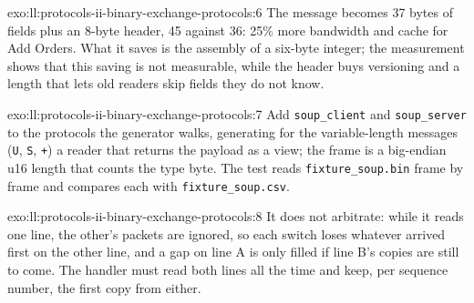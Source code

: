 \begin{solution}{exo:ll:protocols-ii-binary-exchange-protocols:6}
The message becomes 37 bytes of fields plus an 8-byte header, 45 against 36: 25\% more bandwidth and cache for Add Orders.
What it saves is the assembly of a six-byte integer; the measurement shows that this saving is not measurable, while the header
buys versioning and a length that lets old readers skip fields they do not know.
\end{solution}

\begin{solution}{exo:ll:protocols-ii-binary-exchange-protocols:7}
Add \texttt{soup\_client} and \texttt{soup\_server} to the protocols the generator walks, generating for the variable-length
messages (\texttt{U}, \texttt{S}, \texttt{+}) a reader that returns the payload as a view; the frame is a big-endian u16 length
that counts the type byte. The test reads \texttt{fixture\_soup.bin} frame by frame and compares each with
\texttt{fixture\_soup.csv}.
\end{solution}

\begin{solution}{exo:ll:protocols-ii-binary-exchange-protocols:8}
It does not arbitrate: while it reads one line, the other's packets are ignored, so each switch loses whatever arrived first on
the other line, and a gap on line A is only filled if line B's copies are still to come. The handler must read both lines all
the time and keep, per sequence number, the first copy from either.
\end{solution}

